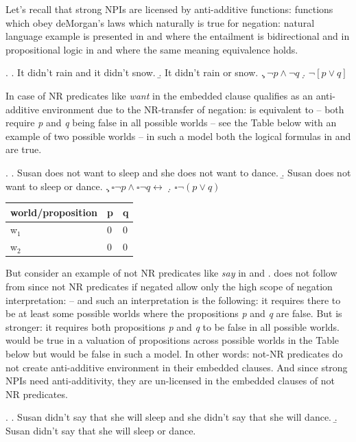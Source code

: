 \documentclass[12pt]{scrartcl}
\begin{document}
Let's recall that strong NPIs are licensed by anti-additive functions: functions which obey deMorgan's laws which naturally is true for negation: natural language example is presented in \Next[a] and \Next[b] where the entailment is bidirectional and in propositional logic in \Next[c] and \Next[d] where the same meaning equivalence holds.

\ex. \a. It didn't rain and it didn't snow. \b. It didn't rain or snow.
\c. \(\neg p \wedge \neg q\) \d. \(\neg[p \vee q]\)

In case of NR predicates like \emph{want} in \Next the embedded clause qualifies as an anti-additive environment due to the NR-transfer of negation: \Next[c] is equivalent to \Next[d] -- both require \textit{p} and \textit{q} being false in all possible worlds -- see the Table below with an example of two possible worlds -- in such a model both the logical formulas in \Next[c] and \Next[d] are true.

\ex. \a. Susan does not want to sleep and she does not want to dance.
\b. Susan does not want to sleep or dance. \c.
\(\square \neg p \wedge \square \neg q \leftrightarrow\) \d.
\(\square \neg(p \vee q)\)

\begin{longtable}[]{@{}lll@{}}
\toprule
world/proposition & p & q\tabularnewline
\midrule
\endhead
w\(_1\) & 0 & 0\tabularnewline
w\(_2\) & 0 & 0\tabularnewline
\bottomrule
\end{longtable}

But consider an example of not NR predicates like \emph{say} in \Next[a] and \Next[b]. \Next[b] does not follow from  \Next[a] since not NR predicates if negated allow only the high scope of negation interpretation: \NNext[a] -- and such an interpretation is the following: it requires there to be at least some possible worlds where the propositions \textit{p} and \textit{q} are false. But \NNext[b] is stronger: it requires both propositions \textit{p} and \textit{q} to be false in all possible worlds. \NNext[a] would be true in a valuation of propositions across possible worlds in the Table below but \NNext[b] would be false in such a model. In other words: not-NR predicates do not create anti-additive environment in their embedded clauses. And since strong NPIs need anti-additivity, they are un-licensed in the embedded clauses of not NR predicates.

\ex. \a. Susan didn't say that she will sleep and she didn't say that
she will dance. \b. Susan didn't say that she will sleep or dance.
\end{document}
